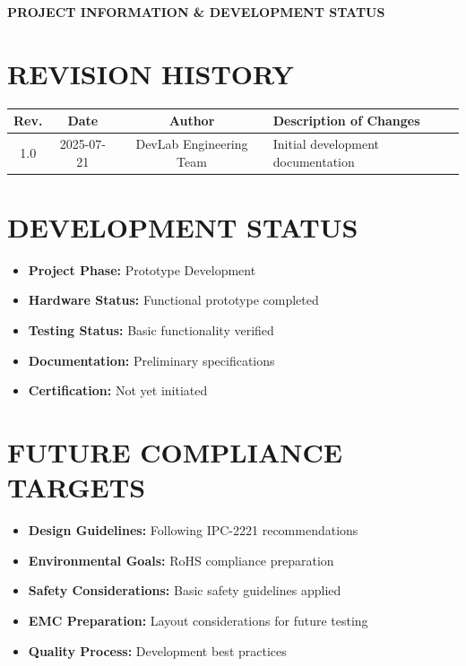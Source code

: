 \documentclass[11pt,a4paper]{article}
\begin{document}
\begin{titlepage}
    \vspace*{2cm}
    
    \begin{center}
    {\Large \textbf{PROJECT INFORMATION \& DEVELOPMENT STATUS}}
    \end{center}
    
    \vspace{1cm}
    
    \section*{REVISION HISTORY}
    \begin{longtable}{|c|c|c|l|}
    \hline
    \textbf{Rev.} & \textbf{Date} & \textbf{Author} & \textbf{Description of Changes} \\
    \hline
    1.0 & 2025-07-21 & DevLab Engineering Team & Initial development documentation \\
    \hline
    \end{longtable}
    
    \vspace{1cm}
    
    \section*{DEVELOPMENT STATUS}
    \begin{itemize}
        \item \textbf{Project Phase:} Prototype Development
        \item \textbf{Hardware Status:} Functional prototype completed
        \item \textbf{Testing Status:} Basic functionality verified
        \item \textbf{Documentation:} Preliminary specifications
        \item \textbf{Certification:} Not yet initiated
    \end{itemize}
    
    \vspace{1cm}
    
    \section*{FUTURE COMPLIANCE TARGETS}
    \begin{itemize}
        \item \textbf{Design Guidelines:} Following IPC-2221 recommendations
        \item \textbf{Environmental Goals:} RoHS compliance preparation
        \item \textbf{Safety Considerations:} Basic safety guidelines applied
        \item \textbf{EMC Preparation:} Layout considerations for future testing
        \item \textbf{Quality Process:} Development best practices
    \end{itemize}
    

\end{titlepage}
\end{document}

